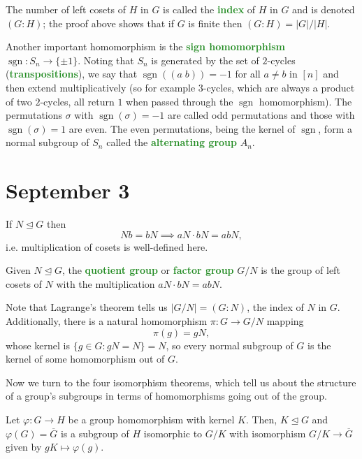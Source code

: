 \documentclass[11pt]{scrartcl}
\providecommand{\ol}{\overline}
\providecommand{\normaleq}{\trianglelefteq}
\providecommand{\vocab}[1]{{\textbf{\textcolor{ForestGreen}{#1}}}}
\providecommand{\sgn}{\operatorname{sgn}}
\providecommand{\abs}[1]{\left|#1\right|}
\begin{document}
The number of left cosets of $H$ in $G$ is called the \vocab{index}
of $H$ in $G$ and is denoted $(G:H)$; the proof above shows that
if $G$ is finite then $(G:H) = \abs G/\abs H$.

Another important homomorphism is the \vocab{sign homomorphism}
$\sgn\colon S_n\to\{\pm1\}$. Noting that $S_n$ is generated by
the set of $2$-cycles (\vocab{transpositions}),
we say that $\sgn((a\; b)) = -1$ for all $a\ne b$ in $[n]$
and then extend multiplicatively
(so for example $3$-cycles, which are always a product of two $2$-cycles,
all return $1$ when passed through the $\sgn$ homomorphism).
The permutations $\sigma$ with $\sgn(\sigma) = -1$
are called odd permutations and those with $\sgn(\sigma) = 1$ are even.
The even permutations, being the kernel of $\sgn$,
form a normal subgroup of $S_n$ called the \vocab{alternating group} $A_n$.

\section{September 3}\label{sec:sep03}

If $N\trianglelefteq G$ then
\begin{equation*}
    Nb = bN \implies aN\cdot bN = abN,
\end{equation*}
i.e. multiplication of cosets is well-defined here.
\begin{definition}
    \label{def:quotient-group}
    Given $N\normaleq G$, the \vocab{quotient group} or \vocab{factor group}
    $G/N$ is the group of left cosets of $N$
    with the multiplication $aN\cdot bN = abN$.
\end{definition}

Note that Lagrange's theorem tells us $\abs{G/N} = (G:N)$,
the index of $N$ in $G$.
Additionally, there is a natural homomorphism $\pi\colon G\to G/N$ mapping
\begin{equation*}
    \pi(g) = gN,
\end{equation*}
whose kernel is $\{g\in G : gN = N\} = N$, so every normal subgroup of $G$
is the kernel of some homomorphism out of $G$.

Now we turn to the four isomorphism theorems,
which tell us about the structure of a group's subgroups
in terms of homomorphisms going out of the group.

\begin{theorem}
    \label{thm:first-iso-thm}
    Let $\varphi\colon G\to H$ be a group homomorphism with kernel $K$.
    Then, $K\normaleq G$ and $\varphi(G) = \ol G$ is
    a subgroup of $H$ isomorphic to $G/K$ with isomorphism
    $G/K\to\ol G$ given by $gK\mapsto \varphi(g)$.
\end{theorem}
\end{document}
